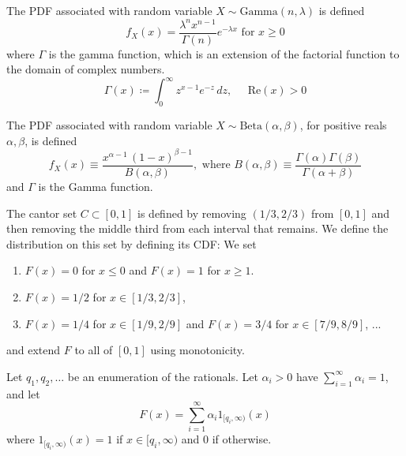 \documentclass{article}
\begin{document}
      \begin{example}
        The PDF associated with random variable $X \sim \mathrm{Gamma}(n, \lambda)$ is defined 
        \begin{equation}
          f_X(x) = \frac{\lambda^n x^{n-1}}{\Gamma(n)} e^{-\lambda x} \text{ for } x \geq 0
        \end{equation}
        where $\Gamma$ is the gamma function, which is an extension of the factorial function to the domain of complex numbers. 
        \begin{equation}
          \Gamma(x) \coloneqq \int_{0}^\infty z^{x-1} e^{-z}\, dz, \;\;\;\;\; \text{Re}(x) > 0
        \end{equation}
      \end{example}

      \begin{example}
        The PDF associated with random variable $X \sim \mathrm{Beta}(\alpha, \beta)$, for positive reals $\alpha, \beta$, is defined 
        \begin{equation}
          f_X (x) \equiv \frac{x^{\alpha-1} \,(1-x)^{\beta-1}}{B(\alpha, \beta)}, \text{ where } B(\alpha, \beta) \equiv \frac{\Gamma(\alpha) \Gamma(\beta)}{\Gamma(\alpha + \beta)}
        \end{equation}
        and $\Gamma$ is the Gamma function. 
      \end{example}

      \begin{example}
        The cantor set $C \subset [0, 1]$ is defined by removing $(1/3, 2/3)$ from $[0, 1]$ and then removing the middle third from each interval that remains. We define the distribution on this set by defining its CDF: We set 
        \begin{enumerate}
          \item $F(x) = 0$ for $x \leq 0$ and $F(x) = 1$ for $x \geq 1$. 
          \item $F(x) = 1/2$ for $x \in [1/3, 2/3]$, 
          \item $F(x) = 1/4$ for $x \in [1/9, 2/9]$ and $F(x) = 3/4$ for $x \in [7/9, 8/9]$, ... 
        \end{enumerate}
        and extend $F$ to all of $[0 ,1]$ using monotonicity. 
      \end{example} 

      \begin{example}
        Let $q_1, q_2, \ldots$ be an enumeration of the rationals. Let $\alpha_i > 0$ have $\sum_{i=1}^\infty \alpha_i = 1$, and let 
        \begin{equation}
          F(x) = \sum_{i=1}^\infty \alpha_i 1_{[q_i, \infty)} (x)
        \end{equation}
        where $1_{[q_i, \infty)} (x) = 1$ if $x \in [q_i, \infty)$ and $0$ if otherwise. 
      \end{example}
\end{document}
